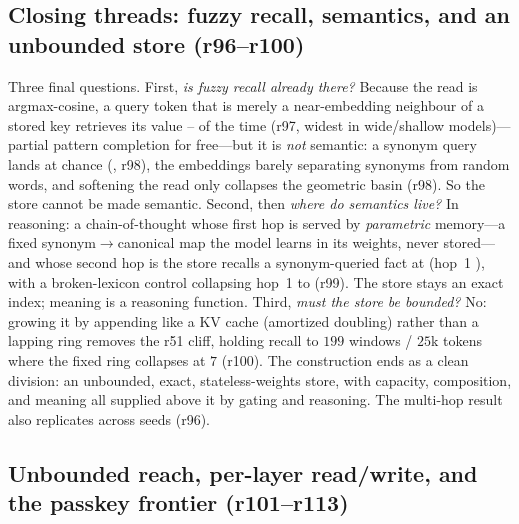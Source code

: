 \subsection{Closing threads: fuzzy recall, semantics, and an unbounded store (r96--r100)}

Three final questions. First, \emph{is fuzzy recall already there?} Because the read is
argmax-cosine, a query token that is merely a near-embedding neighbour of a stored key
retrieves its value -- of the time (r97, widest in wide/shallow
models)---partial pattern completion for free---but it is \emph{not} semantic: a synonym
query lands at chance (, r98), the embeddings barely separating synonyms from
random words, and softening the read only collapses the geometric basin (r98). So the store
cannot be made semantic. Second, then \emph{where do semantics live?} In reasoning:
a chain-of-thought whose first hop is served by \emph{parametric} memory---a fixed
synonym$\to$canonical map the model learns in its weights, never stored---and whose second
hop is the store recalls a synonym-queried fact at  (hop~1 ), with a
broken-lexicon control collapsing hop~1 to  (r99). The store stays an exact index;
meaning is a reasoning function. Third, \emph{must the store be bounded?} No: growing it by
appending like a KV cache (amortized doubling) rather than a lapping ring removes the r51
cliff, holding recall to $199$ windows / $25$k tokens where the fixed ring collapses at $7$
(r100). The construction ends as a clean division: an unbounded, exact, stateless-weights
store, with capacity, composition, and meaning all supplied above it by gating and reasoning.
The multi-hop result also replicates across seeds (r96).

\subsection{Unbounded reach, per-layer read/write, and the passkey frontier (r101--r113)}

